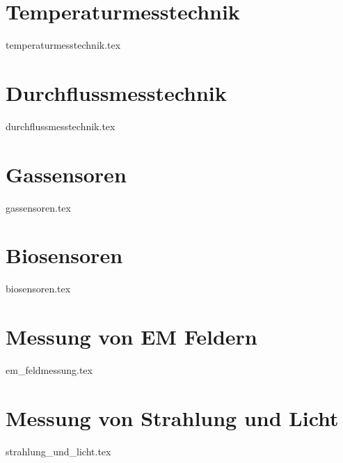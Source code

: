 \part{Temperaturmesstechnik}
{temperaturmesstechnik.tex}

\part{Durchflussmesstechnik}
{durchflussmesstechnik.tex}

\part{Gassensoren}
{gassensoren.tex}

\part{Biosensoren}
{biosensoren.tex}

\part{Messung von EM Feldern}
{em_feldmessung.tex}

\part{Messung von Strahlung und Licht}
{strahlung_und_licht.tex}